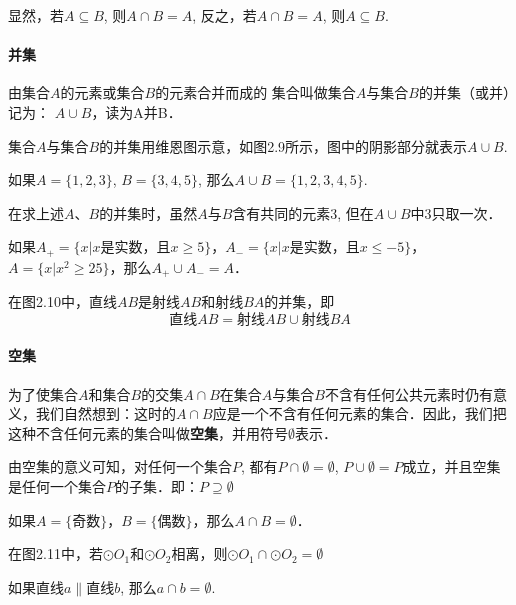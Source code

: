 显然，若$A\subseteq B$, 则$A\cap B=A$, 反之，若$A\cap B=A$, 则$A\subseteq B$.

\paragraph{并集}
由集合$A$的元素或集合$B$的元素合并而成的
集合叫做集合$A$与集合$B$的并集（或并）记为：
$A\cup B$，读为A并B．

集合$A$与集合$B$的并集用维恩图示意，如图2.9所示，图中的阴影部分就表示$A\cup B$.

如果$A=\{1, 2, 3\}$, $B=\{3, 4, 5\}$, 那么$A\cup B= \{1, 2, 3, 4, 5\}$.

\begin{rmk}
	在求上述$A$、$B$的并集时，虽然$A$与$B$含有共同的元素3, 但在$A\cup B$中3只取一次．
\end{rmk}

如果$A_+=\{x|x\text{是实数，且}x\ge 5\}$，$A_-=\{x|x\text{是实数，且}x\le -5\}$，$A=\{x|x^2\ge 25\}$，那么$A_+\cup A_-=A$．

在图2.10中，直线$AB$是射线$AB$和射线$BA$的并集，即
\[\text{直线}AB=\text{射线}AB \cup \text{射线}BA\]

\paragraph{空集}
为了使集合$A$和集合$B$的交集$A\cap B$在集合$A$与集合$B$不含有任何公共元素时仍有意义，我们自然想到：这时的$A\cap B$应是一个不含有任何元素的集合．因此，我们把这种不含任何元素的集合叫做\textbf{空集}，并用符号$\emptyset$表示．

由空集的意义可知，对任何一个集合$P$, 都有$P\cap \emptyset=\emptyset$, $P\cup\emptyset=P$成立，并且空集是任何一个集合$P$的子集．即：$P\supseteq \emptyset$

如果$A=\{\text{奇数}\}$，$B=\{\text{偶数}\}$，那么$A\cap B=\emptyset$．

在图2.11中，若$\odot O_1$和$\odot O_2$相离，则$\odot O_1\cap \odot O_2=\emptyset$
\begin{figure}[htp]
	\centering
	\caption{}
\end{figure}

如果直线$a\parallel$直线$b$, 那么$a\cap b=\emptyset$.


